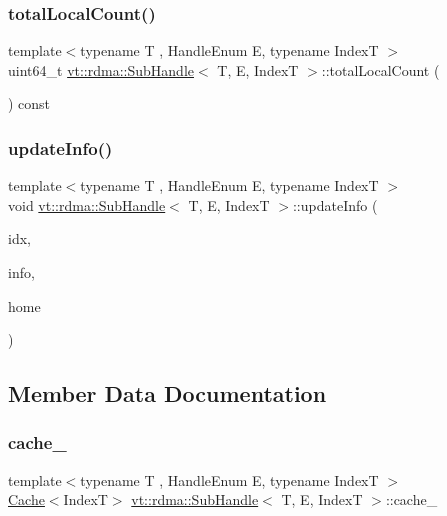 \subsubsection{\texorpdfstring{total\+Local\+Count()}{totalLocalCount()}}
{\footnotesize\ttfamily template$<$typename T , Handle\+Enum E, typename IndexT $>$ \\
uint64\+\_\+t \hyperlink{structvt_1_1rdma_1_1_sub_handle}{vt\+::rdma\+::\+Sub\+Handle}$<$ T, E, IndexT $>$\+::total\+Local\+Count (\begin{DoxyParamCaption}{ }\end{DoxyParamCaption}) const}

\mbox{\label{structvt_1_1rdma_1_1_sub_handle_a3bd9d6c4854f47bf9cc6eebfa9c18fca}} 
\subsubsection{\texorpdfstring{update\+Info()}{updateInfo()}}
{\footnotesize\ttfamily template$<$typename T , Handle\+Enum E, typename IndexT $>$ \\
void \hyperlink{structvt_1_1rdma_1_1_sub_handle}{vt\+::rdma\+::\+Sub\+Handle}$<$ T, E, IndexT $>$\+::update\+Info (\begin{DoxyParamCaption}\item[{IndexT const \&}]{idx,  }\item[{\hyperlink{structvt_1_1rdma_1_1_index_info}{Index\+Info}}]{info,  }\item[{\hyperlink{namespacevt_a866da9d0efc19c0a1ce79e9e492f47e2}{Node\+Type}}]{home }\end{DoxyParamCaption})}



\subsection{Member Data Documentation}
\mbox{\label{structvt_1_1rdma_1_1_sub_handle_aa4d5fc9bb2240a72af8af9164e1d8bf3}} 
\subsubsection{\texorpdfstring{cache\+\_\+}{cache\_}}
{\footnotesize\ttfamily template$<$typename T , Handle\+Enum E, typename IndexT $>$ \\
\hyperlink{structvt_1_1rdma_1_1_cache}{Cache}$<$IndexT$>$ \hyperlink{structvt_1_1rdma_1_1_sub_handle}{vt\+::rdma\+::\+Sub\+Handle}$<$ T, E, IndexT $>$\+::cache\+\_\+\hspace{0.3cm}{\ttfamily [protected]}}


